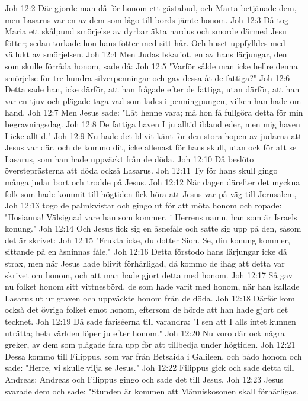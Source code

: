 Joh 12:2  Där gjorde man då för honom ett gästabud, och Marta betjänade dem, men Lasarus var en av dem som lågo till bords jämte honom.
Joh 12:3  Då tog Maria ett skålpund smörjelse av dyrbar äkta nardus och smorde därmed Jesu fötter; sedan torkade hon hans fötter med sitt hår. Och huset uppfylldes med vällukt av smörjelsen.
Joh 12:4  Men Judas Iskariot, en av hans lärjungar, den som skulle förråda honom, sade då:
Joh 12:5  "Varför sålde man icke hellre denna smörjelse för tre hundra silverpenningar och gav dessa åt de fattiga?"
Joh 12:6  Detta sade han, icke därför, att han frågade efter de fattiga, utan därför, att han var en tjuv och plägade taga vad som lades i penningpungen, vilken han hade om hand.
Joh 12:7  Men Jesus sade: "Låt henne vara; må hon få fullgöra detta för min begravningsdag.
Joh 12:8  De fattiga haven I ju alltid ibland eder, men mig haven I icke alltid."
Joh 12:9  Nu hade det blivit känt för den stora hopen av judarna att Jesus var där, och de kommo dit, icke allenast för hans skull, utan ock för att se Lasarus, som han hade uppväckt från de döda.
Joh 12:10  Då beslöto översteprästerna att döda också Lasarus.
Joh 12:11  Ty för hans skull gingo många judar bort och trodde på Jesus.
Joh 12:12  När dagen därefter det myckna folk som hade kommit till högtiden fick höra att Jesus var på väg till Jerusalem,
Joh 12:13  togo de palmkvistar och gingo ut för att möta honom och ropade: "Hosianna! Välsignad vare han som kommer, i Herrens namn, han som är Israels konung."
Joh 12:14  Och Jesus fick sig en åsnefåle och satte sig upp på den, såsom det är skrivet:
Joh 12:15  "Frukta icke, du dotter Sion. Se, din konung kommer, sittande på en åsninnas fåle."
Joh 12:16  Detta förstodo hans lärjungar icke då strax, men när Jesus hade blivit förhärligad, då kommo de ihåg att detta var skrivet om honom, och att man hade gjort detta med honom.
Joh 12:17  Så gav nu folket honom sitt vittnesbörd, de som hade varit med honom, när han kallade Lasarus ut ur graven och uppväckte honom från de döda.
Joh 12:18  Därför kom också det övriga folket emot honom, eftersom de hörde att han hade gjort det tecknet.
Joh 12:19  Då sade fariséerna till varandra: "I sen att I alls intet kunnen uträtta; hela världen löper ju efter honom."
Joh 12:20  Nu voro där ock några greker, av dem som plägade fara upp för att tillbedja under högtiden.
Joh 12:21  Dessa kommo till Filippus, som var från Betsaida i Galileen, och bådo honom och sade: "Herre, vi skulle vilja se Jesus."
Joh 12:22  Filippus gick och sade detta till Andreas; Andreas och Filippus gingo och sade det till Jesus.
Joh 12:23  Jesus svarade dem och sade: "Stunden är kommen att Människosonen skall förhärligas.
